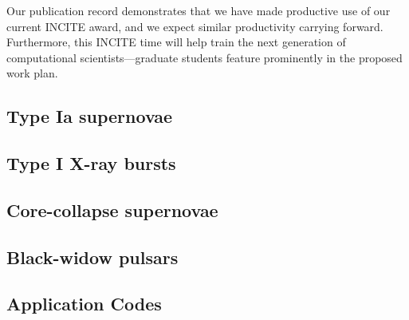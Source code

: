 \documentclass[11pt,letterpaper,english]{article}
\begin{document}
Our publication record demonstrates that we have made productive use
of our current INCITE award, and we expect similar productivity
carrying forward.  Furthermore, this INCITE time will help train
the next generation of computational scientists---graduate students
feature prominently in the proposed work plan.


\subsection{Type Ia supernovae}




\subsection{Type I X-ray bursts}




\subsection{Core-collapse supernovae}




\subsection{Black-widow pulsars}




\subsection{Application Codes}
\end{document}
